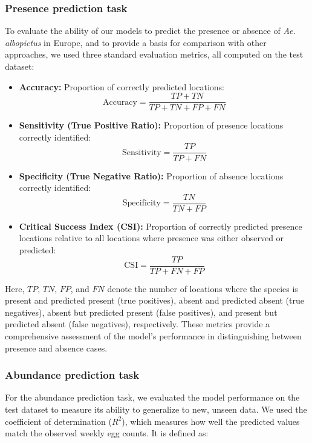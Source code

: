 \documentclass[preprint,12pt]{elsarticle}
\begin{document}
\subsubsection{Presence prediction task}

To evaluate the ability of our models to predict the presence or absence of \textit{Ae. albopictus} in Europe, and to provide a basis for comparison with other approaches, we used three standard evaluation metrics, all computed on the test dataset:
\begin{itemize}
    \item \textbf{Accuracy:} Proportion of correctly predicted locations:
    \[
    \mathrm{Accuracy} = \frac{TP + TN}{TP + TN + FP + FN}
    \]

    \item \textbf{Sensitivity (True Positive Ratio):} Proportion of presence locations correctly identified:
    \[
    \mathrm{Sensitivity} = \frac{TP}{TP + FN}
    \]

    \item \textbf{Specificity (True Negative Ratio):} Proportion of absence locations correctly identified:
    \[
    \mathrm{Specificity} = \frac{TN}{TN + FP}
    \]
    \item \textbf{Critical Success Index (CSI):} Proportion of correctly predicted presence locations relative to all locations where presence was either observed or predicted:
    \[
        \mathrm{CSI} = \frac{TP}{TP + FN + FP}
    \]
\end{itemize}

Here, \( TP \), \( TN \), \( FP \), and \( FN \) denote the number of locations where the species is present and predicted present (true positives), absent and predicted absent (true negatives), absent but predicted present (false positives), and present but predicted absent (false negatives), respectively.
These metrics provide a comprehensive assessment of the model’s performance in distinguishing between presence and absence cases.

\subsubsection{Abundance prediction task}
For the abundance prediction task, we evaluated the model performance on the test dataset to measure its ability to generalize to new, unseen data. We used the coefficient of determination ($R^2$), which measures how well the predicted values match the observed weekly egg counts. It is defined as:
\end{document}
